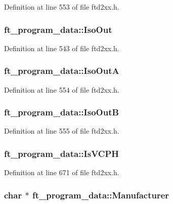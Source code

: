 Definition at line 553 of file ftd2xx.h.\hypertarget{structft__program__data_a829cd262ba4cee6a25d652bfe145724f}{
\subsubsection[{IsoOut}]{ {\bf ft\_\-program\_\-data::IsoOut}}}
\label{structft__program__data_a829cd262ba4cee6a25d652bfe145724f}


Definition at line 543 of file ftd2xx.h.\hypertarget{structft__program__data_ae4f536d9a3ee46681f6f0c9c88268458}{
\subsubsection[{IsoOutA}]{ {\bf ft\_\-program\_\-data::IsoOutA}}}
\label{structft__program__data_ae4f536d9a3ee46681f6f0c9c88268458}


Definition at line 554 of file ftd2xx.h.\hypertarget{structft__program__data_a07e87e6ceb9f1399884586926139b25c}{
\subsubsection[{IsoOutB}]{ {\bf ft\_\-program\_\-data::IsoOutB}}}
\label{structft__program__data_a07e87e6ceb9f1399884586926139b25c}


Definition at line 555 of file ftd2xx.h.\hypertarget{structft__program__data_aa92920576a9253a1ea656bb9979bdace}{
\subsubsection[{IsVCPH}]{ {\bf ft\_\-program\_\-data::IsVCPH}}}
\label{structft__program__data_aa92920576a9253a1ea656bb9979bdace}


Definition at line 671 of file ftd2xx.h.\hypertarget{structft__program__data_a803860e98c4c7be38685b9c69e4684a5}{
\subsubsection[{Manufacturer}]{\setlength{\rightskip}{0pt plus 5cm}char $\ast$ {\bf ft\_\-program\_\-data::Manufacturer}}}
\label{structft__program__data_a803860e98c4c7be38685b9c69e4684a5}


